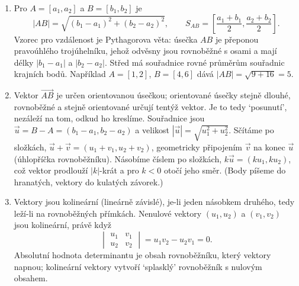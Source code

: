 \begin{enumerate}[label=\textbf{\arabic*.}, leftmargin=*, itemsep=0.8em]
  \item {}
  Pro $A = [a_1, a_2]$ a $B = [b_1, b_2]$ je
  \begin{equation*}
    |AB| = \sqrt{{(b_1 - a_1)}^2 + {(b_2 - a_2)}^2}, \qquad S_{AB} = \left[\frac{a_1 + b_1}{2}, \frac{a_2 + b_2}{2}\right].
  \end{equation*}
  Vzorec pro vzdálenost je Pythagorova věta: úsečka $AB$ je přeponou pravoúhlého trojúhelníku, jehož odvěsny jsou rovnoběžné s osami a mají délky $|b_1 - a_1|$ a $|b_2 - a_2|$. Střed má souřadnice rovné průměrům souřadnic krajních bodů. Například $A = [1, 2]$, $B = [4, 6]$ dává $|AB| = \sqrt{9 + 16} = 5$. 

  \item {}
  Vektor $\overrightarrow{AB}$ je určen orientovanou úsečkou; orientované úsečky stejně dlouhé, rovnoběžné a stejně orientované určují tentýž vektor. Je to tedy `posunutí', nezáleží na tom, odkud ho kreslíme. Souřadnice jsou $\vec{u} = B - A = (b_1 - a_1, b_2 - a_2)$ a velikost $|\vec{u}| = \sqrt{u_1^2 + u_2^2}$. Sčítáme po složkách, $\vec{u} + \vec{v} = (u_1 + v_1, u_2 + v_2)$, geometricky připojením $\vec{v}$ na konec $\vec{u}$ (úhlopříčka rovnoběžníku). Násobíme číslem po složkách, $k\vec{u} = (ku_1, ku_2)$, což vektor prodlouží $|k|$-krát a pro $k < 0$ otočí jeho směr. (Body píšeme do hranatých, vektory do kulatých závorek.) 

  \item {}
  Vektory jsou kolineární (lineárně závislé), je-li jeden násobkem druhého, tedy leží-li na rovnoběžných přímkách. Nenulové vektory $(u_1, u_2)$ a $(v_1, v_2)$ jsou kolineární, právě když
  \begin{equation*}
    \begin{vmatrix} u_1 & v_1\\ u_2 & v_2 \end{vmatrix} = u_1v_2 - u_2v_1 = 0.
  \end{equation*}
  Absolutní hodnota determinantu je obsah rovnoběžníku, který vektory napnou; kolineární vektory vytvoří `splasklý' rovnoběžník s nulovým obsahem. 


\end{enumerate}
